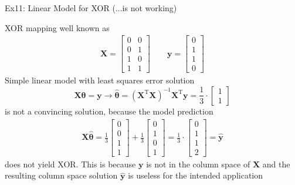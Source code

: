 \documentclass[mathserif, aspectratio=1610]{intbeamer}
\begin{document}
\begin{frame}[t]{Ex11: Linear Model for XOR (...is not working)}

XOR mapping well known as
\begin{align*}
\bm{X} =
\begin{bmatrix}
0 & 0\\
0 & 1\\
1 & 0\\
1 & 1
\end{bmatrix}\qquad
\bm{y} =
\begin{bmatrix}
0\\
1\\
1\\
0
\end{bmatrix}
\end{align*}
Simple linear model with least squares error solution
$$\bm{X} \bm{\theta} = \bm{y} \rightarrow \hat{\bm{\theta}} = (\bm{X}^\mathrm{T} \bm{X})^{-1} \bm{X}^\mathrm{T} \bm{y}
=
\frac{1}{3}\cdot
\begin{bmatrix}
1\\
1
\end{bmatrix}
$$
is not a convincing solution, because the model prediction
\begin{align*}
\bm{X} \hat{\bm{\theta}} =
\frac{1}{3}
\begin{bmatrix}
0\\
0\\
1\\
1
\end{bmatrix}
+
\frac{1}{3}
\begin{bmatrix}
0\\
1\\
0\\
1
\end{bmatrix}
=
\frac{1}{3}\cdot
\begin{bmatrix}
0\\
1\\
1\\
2
\end{bmatrix}
=\hat{\bm{y}}
\end{align*}
does not yield XOR. This is because $\bm{y}$ is not in the column space of $\bm{X}$ and
the resulting column space solution $\hat{\bm{y}}$
is useless for the intended application

\end{frame}
\end{document}
